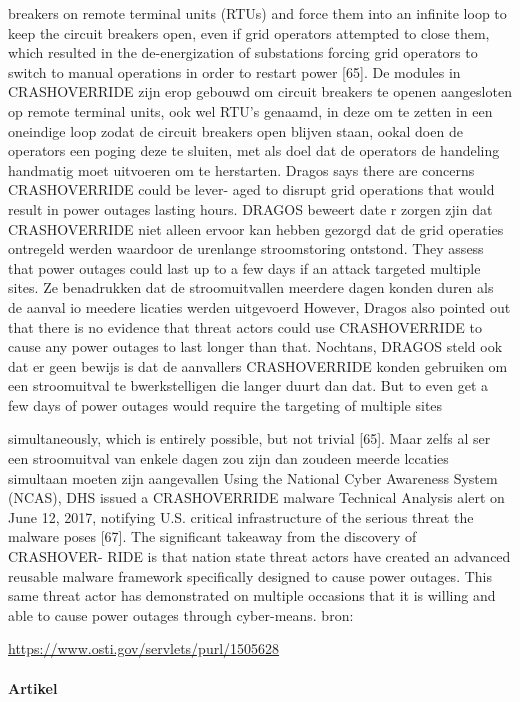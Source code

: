 		breakers on remote terminal units (RTUs) and force them into an infinite
		loop to keep the circuit breakers open, even if grid operators attempted
		to close them, which resulted in the de-energization of substations forcing
		grid operators to switch to manual operations in order to restart power
		[65]. De modules in CRASHOVERRIDE zijn erop gebouwd om circuit breakers te openen
		aangesloten op remote terminal units, ook wel RTU’s genaamd, in deze om te zetten in een
		oneindige loop zodat de circuit breakers open blijven staan, ookal doen de operators een
		poging deze te sluiten, met als doel dat de operators de handeling handmatig moet uitvoeren
		om te herstarten.
		Dragos says there are concerns CRASHOVERRIDE could be lever-
		aged to disrupt grid operations that would result in power outages lasting
		hours. DRAGOS beweert date r zorgen zjin dat CRASHOVERRIDE niet alleen ervoor kan
		hebben gezorgd dat de grid operaties ontregeld werden waardoor de urenlange
		stroomstoring ontstond.
		They assess that power outages could last up to a few days if an attack targeted multiple
		sites. Ze benadrukken dat de stroomuitvallen meerdere dagen konden duren als de aanval io
		meedere licaties werden uitgevoerd
		However, Dragos also pointed out that there is no evidence that threat actors could use
		CRASHOVERRIDE to cause any power outages to last longer than that. Nochtans,
		DRAGOS steld ook dat er geen bewijs is dat de aanvallers CRASHOVERRIDE konden
		gebruiken om een stroomuitval te bwerkstelligen die langer duurt dan dat.
		But to even get a few days of power outages would require the targeting of multiple sites
		
		simultaneously, which is entirely possible, but not trivial [65]. Maar zelfs al ser een
		stroomuitval van enkele dagen zou zijn dan zoudeen meerde lccaties simultaan moeten zijn
		aangevallen
		Using the National Cyber Awareness System (NCAS), DHS issued a
		CRASHOVERRIDE malware Technical Analysis alert on June 12, 2017, notifying U.S. critical
		infrastructure of the serious threat the malware poses [67].
		The significant takeaway from the discovery of CRASHOVER-
		RIDE is that nation state threat actors have created an advanced reusable
		malware framework specifically designed to cause power outages.
		This same threat actor has demonstrated on multiple occasions that it is willing and able to
		cause power outages through cyber-means.
		bron:
		
		\url{https://www.osti.gov/servlets/purl/1505628}
		
		\paragraph{Artikel}
		
